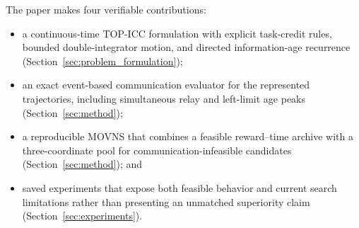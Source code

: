 The paper makes four verifiable contributions:
\begin{itemize}
    \item a continuous-time TOP-ICC formulation with explicit task-credit rules, bounded double-integrator motion, and directed information-age recurrence (Section~\ref{sec:problem_formulation});
    \item an exact event-based communication evaluator for the represented trajectories, including simultaneous relay and left-limit age peaks (Section~\ref{sec:method});
    \item a reproducible MOVNS that combines a feasible reward--time archive with a three-coordinate pool for communication-infeasible candidates (Section~\ref{sec:method}); and
    \item saved experiments that expose both feasible behavior and current search limitations rather than presenting an unmatched superiority claim (Section~\ref{sec:experiments}).
\end{itemize}
